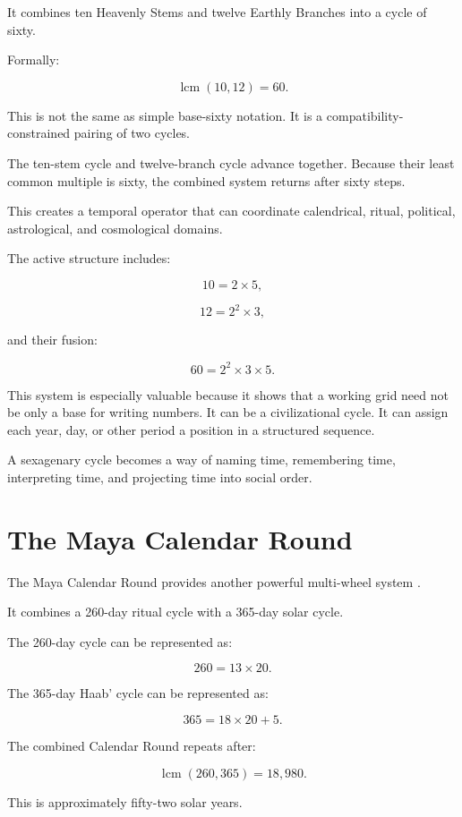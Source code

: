 \documentclass[11pt]{book}
\begin{document}
It combines ten Heavenly Stems and twelve Earthly Branches into a cycle of sixty.

Formally:

\[
\operatorname{lcm}(10,12)=60.
\]

This is not the same as simple base-sixty notation. It is a compatibility-constrained pairing of two cycles.

The ten-stem cycle and twelve-branch cycle advance together. Because their least common multiple is sixty, the combined system returns after sixty steps.

This creates a temporal operator that can coordinate calendrical, ritual, political, astrological, and cosmological domains.

The active structure includes:

\[
10 = 2 \times 5,
\]

\[
12 = 2^2 \times 3,
\]

and their fusion:

\[
60 = 2^2 \times 3 \times 5.
\]

This system is especially valuable because it shows that a working grid need not be only a base for writing numbers. It can be a civilizational cycle. It can assign each year, day, or other period a position in a structured sequence.

A sexagenary cycle becomes a way of naming time, remembering time, interpreting time, and projecting time into social order.

\section{The Maya Calendar Round}

The Maya Calendar Round provides another powerful multi-wheel system \cite{BrickerBricker2011AstronomyMayaCodices,Thompson1950MayaHieroglyphicWriting,Coe2011Maya}.

It combines a 260-day ritual cycle with a 365-day solar cycle.

The 260-day cycle can be represented as:

\[
260 = 13 \times 20.
\]

The 365-day Haab' cycle can be represented as:

\[
365 = 18 \times 20 + 5.
\]

The combined Calendar Round repeats after:

\[
\operatorname{lcm}(260,365)=18{,}980.
\]

This is approximately fifty-two solar years.
\end{document}
